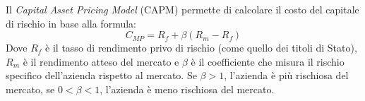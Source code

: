 Il \textit{Capital Asset Pricing Model} (CAPM) permette di calcolare il costo del capitale di rischio in base alla formula:
\begin{equation*}
    C_{MP}=R_f+\beta(R_m-R_f)
\end{equation*}
Dove $R_f$ è il tasso di rendimento privo di rischio (come quello dei titoli di Stato), $R_m$ è il rendimento atteso del mercato e $\beta$ è il coefficiente che misura il rischio specifico dell’azienda rispetto al mercato. Se $\beta > 1$, l’azienda è più rischiosa del mercato, se $0 < \beta < 1$, l’azienda è meno rischiosa del mercato.